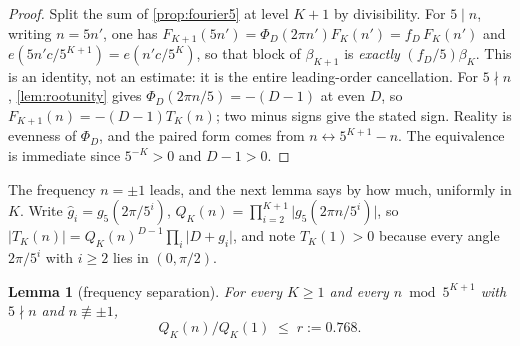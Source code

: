 \documentclass[11pt]{amsart}
\newtheorem{lemma}[theorem]{Lemma}
\theoremstyle{definition}
\theoremstyle{remark}
\begin{document}
\begin{proof}
Split the sum of \cref{prop:fourier5} at level $K+1$ by divisibility. For $5 \mid n$, writing $n = 5n'$, one has $F_{K+1}(5n') = \Phi_D(2\pi n')F_K(n') = f_D\,F_K(n')$ and $e(5n'c/5^{K+1}) = e(n'c/5^K)$, so that block of $\beta_{K+1}$ is \emph{exactly} $(f_D/5)\beta_K$. This is an identity, not an estimate: it is the entire leading-order cancellation. For $5 \nmid n$, \cref{lem:rootunity} gives $\Phi_D(2\pi n/5) = -(D-1)$ at even $D$, so $F_{K+1}(n) = -(D-1)T_K(n)$; two minus signs give the stated sign. Reality is evenness of $\Phi_D$, and the paired form comes from $n \leftrightarrow 5^{K+1}-n$. The equivalence is immediate since $5^{-K} > 0$ and $D - 1 > 0$.
\end{proof}

The frequency $n = \pm 1$ leads, and the next lemma says by how much, uniformly in $K$. Write $\hat g_i = g_5(2\pi/5^i)$, $Q_K(n) = \prod_{i=2}^{K+1}\lvert g_5(2\pi n/5^i)\rvert$, so $\lvert T_K(n)\rvert = Q_K(n)^{D-1}\prod_i\lvert D + g_i\rvert$, and note $T_K(1) > 0$ because every angle $2\pi/5^i$ with $i \ge 2$ lies in $(0,\pi/2)$.

\begin{lemma}[frequency separation]
\label{lem:sep5}
For every $K \ge 1$ and every $n \bmod 5^{K+1}$ with $5 \nmid n$ and $n \not\equiv \pm 1$,
\[
  Q_K(n)/Q_K(1) \;\le\; r := 0.768 .
\]
\end{lemma}
\end{document}
